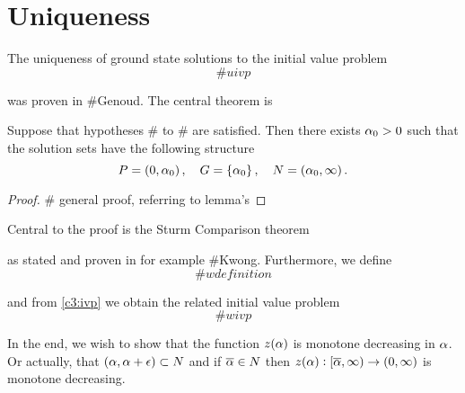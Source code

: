 \newcommand{\e}{\epsilon}
\def\at{
  \left.
  \vphantom{\int}
  \right|
}
\newcommand{\as}{\a^{*}}
\chapter{Uniqueness}
\label{uniqueness}

The uniqueness of ground state solutions to the initial value problem
\[
\# u ivp
\]

was proven in \#Genoud. The central theorem is
\begin{theorem}
Suppose that {\red hypotheses} \# to \# are satisfied. Then there exists $\alpha_0>0$ such
that the solution sets have the following structure
\[
P = \left(0,\alpha_0\right),\quad G = \left\{\alpha_0\right\},\quad N =
\left(\alpha_0,\infty\right).
\]
\end{theorem}
\begin{proof}
\# general proof, referring to lemma's
\end{proof}

Central to the proof is the Sturm Comparison theorem
\begin{theorem}
\end{theorem}

as stated and proven in for example \#Kwong. Furthermore, we define 
\[
\# w definition
\]

and from \eqref{c3:ivp} we obtain the related initial value problem
\[
\# w ivp
\]

{\red In the end, we wish to show that the function $z(\alpha)$ is monotone decreasing in
$\alpha$. Or actually, that $(\a, \a+\e)\subset N$ and if $\overline{\alpha}\in N$ then $z(\alpha) :
[\overline{\alpha}, \infty)\to(0,\infty)$ is monotone decreasing.}


